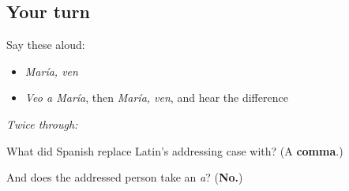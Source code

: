 \subsection*{Your turn}
Say these aloud:

\begin{itemize}
\raggedright
  \item \emph{María, ven}
  \item \emph{Veo a María}, then \emph{María, ven}, and hear the difference
\end{itemize}

\emph{Twice through:}

\begin{tcolorbox}[breakable,colback=teal!4,colframe=teal!35!black,title={Before you move on}]
What did Spanish replace Latin's addressing case with? (A \textbf{comma}.)

And does the addressed person take an \emph{a}? (\textbf{No.})
\end{tcolorbox}
